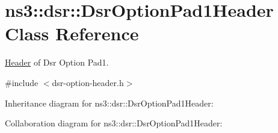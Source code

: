 \hypertarget{classns3_1_1dsr_1_1DsrOptionPad1Header}{}\section{ns3\+:\+:dsr\+:\+:Dsr\+Option\+Pad1\+Header Class Reference}
\label{classns3_1_1dsr_1_1DsrOptionPad1Header}


\hyperlink{classns3_1_1Header}{Header} of Dsr Option Pad1.  




{\ttfamily \#include $<$dsr-\/option-\/header.\+h$>$}



Inheritance diagram for ns3\+:\+:dsr\+:\+:Dsr\+Option\+Pad1\+Header\+:


Collaboration diagram for ns3\+:\+:dsr\+:\+:Dsr\+Option\+Pad1\+Header\+:
